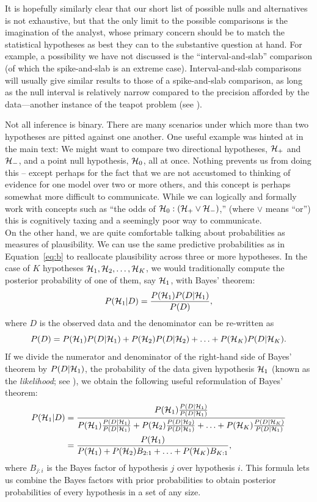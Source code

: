 It is hopefully similarly clear that our short list of possible nulls and alternatives is not exhaustive, but that the only limit to the possible comparisons is the imagination of the analyst, whose primary concern should be to match the statistical hypotheses as best they can to the substantive question at hand.  For example, a possibility we have not discussed is the ``interval-and-slab'' comparison (of which the spike-and-slab is an extreme case). Interval-and-slab comparisons will usually give similar results to those of a spike-and-slab comparison, as long as the null interval is relatively narrow compared to the precision afforded by the data---another instance of the teapot problem (see ).
\begin{tcolorbox}[title=Box~1: Evaluating more than two hypotheses at once,code={\singlespacing}]
Not all inference is binary.  There are many scenarios under which more than two hypotheses are pitted against one another.  One useful example was hinted at in the main text: We might want to compare two directional hypotheses, ${\mathcal{H}}_+$ and ${\mathcal{H}}_-$, and a point null hypothesis, ${\mathcal{H}}_0$, all at once.  Nothing prevents us from doing this -- except perhaps for the fact that we are not accustomed to thinking of evidence for one model over two or more others, and this concept is perhaps somewhat more difficult to communicate.  While we can logically and formally work with concepts such as ``the odds of ${\mathcal{H}}_0 : ({\mathcal{H}}_+ \lor {\mathcal{H}}_-)$,'' (where $\lor$ means ``or'') this is cognitively taxing and a seemingly poor way to communicate.\\[-1ex]

On the other hand, we are quite comfortable talking about probabilities as measures of plausibility. We can use the same predictive probabilities as in Equation~\ref{eq:b} to reallocate plausibility across three or more hypotheses. In the case of $K$ hypotheses ${\mathcal{H}}_1, {\mathcal{H}}_2, \ldots, {\mathcal{H}}_K$, we would traditionally compute the posterior probability of one of them, say ${\mathcal{H}}_1$, with Bayes' theorem: $$P({\mathcal{H}}_1|D) = \frac{P({\mathcal{H}}_1)P(D|{\mathcal{H}}_1)}{P(D)},$$ where $D$ is the observed data and the denominator can be re-written as $$P(D) = P({\mathcal{H}}_1)P(D|{\mathcal{H}}_1)+P({\mathcal{H}}_2)P(D|{\mathcal{H}}_2)+\ldots+P({\mathcal{H}}_K)P(D|{\mathcal{H}}_K).$$ If we divide the numerator and denominator of the right-hand side of Bayes' theorem by $P(D|{\mathcal{H}}_1)$, the probability of the data given hypothesis ${\mathcal{H}}_1$ (known as the \textit{likelihood}; see ), we obtain the following useful reformulation of Bayes' theorem: 
\begin{align*}
P({\mathcal{H}}_1 | D) &= \frac{P({\mathcal{H}}_1) \frac{P(D|{\mathcal{H}}_1)}{P(D|{\mathcal{H}}_1)} }{P({\mathcal{H}}_1)\frac{P(D|{\mathcal{H}}_1)}{P(D|{\mathcal{H}}_1)} + P({\mathcal{H}}_2) \frac{P(D|{\mathcal{H}}_2)}{P(D|{\mathcal{H}}_1)} + \ldots + P({\mathcal{H}}_K) \frac{P(D|{\mathcal{H}}_K)}{P(D|{\mathcal{H}}_1)}}\\
&= \frac{P({\mathcal{H}}_1)}{P({\mathcal{H}}_1) + P({\mathcal{H}}_2) B_{2:1} + \ldots + P({\mathcal{H}}_K) B_{K:1}},
\end{align*}
where $B_{j:i}$ is the Bayes factor of hypothesis $j$ over hypothesis $i$. This formula lets us combine the Bayes factors with prior probabilities to obtain posterior probabilities of every hypothesis in a set of any size.\\[-1ex]


\end{tcolorbox}

